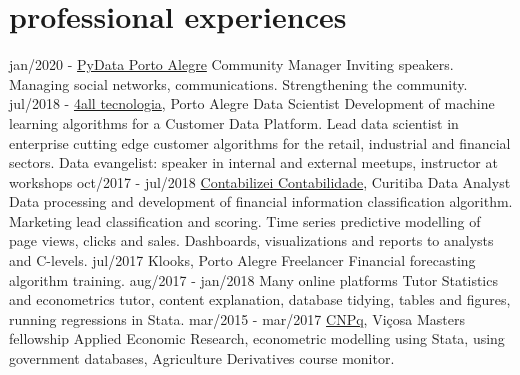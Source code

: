 \documentclass[]{friggeri-cv}
\begin{document}
\section{professional experiences}

\begin{entrylist}
  \entry
    {jan/2020 - }
    {\href{https://www.meetup.com/PyData-Porto-Alegre}{PyData Porto Alegre}}
    {Community Manager}
    {Inviting speakers. Managing social networks, communications. Strengthening the community.}
  \entry
    {jul/2018 - }
    {\href{https://www.4all.com/}{4all tecnologia}, Porto Alegre}
    {Data Scientist}
    {Development of machine learning algorithms for a Customer Data Platform.
    Lead data scientist in enterprise cutting edge customer algorithms for the retail, industrial and financial sectors.
    Data evangelist: speaker in internal and external meetups, instructor at workshops}
  \entry
    {oct/2017 - jul/2018}
    {\href{https://www.contabilizei.com.br}{Contabilizei Contabilidade}, Curitiba}
    {Data Analyst}
    {Data processing and development of financial information classification algorithm.
    Marketing lead classification and scoring.
    Time series predictive modelling of page views, clicks and sales.
    Dashboards, visualizations and reports to analysts and C-levels.}
  \entry
    {jul/2017}
    {Klooks, Porto Alegre}
    {Freelancer}
    {Financial forecasting algorithm training.}
  \entry
    {aug/2017 - jan/2018}
    {Many online platforms}
    {Tutor}
    {Statistics and econometrics tutor, content explanation, database tidying, tables and figures, running regressions in Stata.}
  \entry
    {mar/2015 - mar/2017}
    {\href{cnpq.br}{CNPq}, Viçosa}
    {Masters fellowship}
    {Applied Economic Research, econometric modelling using Stata, using government databases, Agriculture Derivatives course monitor.}
\end{entrylist}
\end{document}
